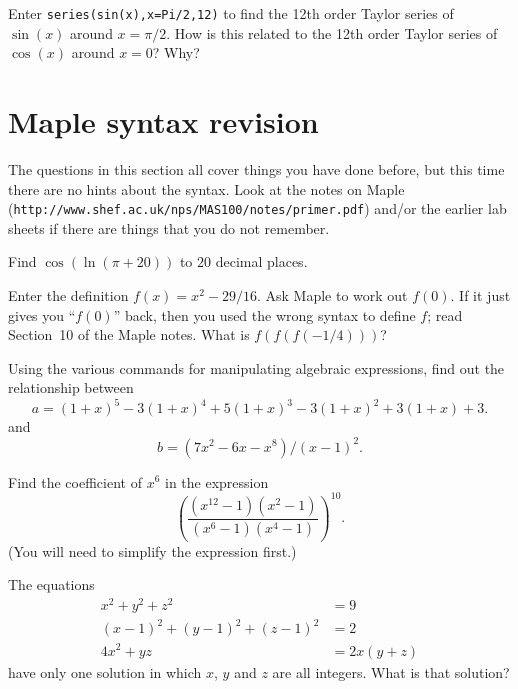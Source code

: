 \documentclass[a4paper,10pt]{amsbook}
\begin{document}
\begin{exercise}\label{ex-sin-shift}
 Enter \verb~series(sin(x),x=Pi/2,12)~ to find the 12th
 order Taylor series of $\sin(x)$ around $x=\pi/2$.  How
 is this related to the 12th order Taylor series of
 $\cos(x)$ around $x=0$?  Why? 
\end{exercise}

\section{Maple syntax revision}

The questions in this section all cover things you have done
before, but this time there are no hints about the syntax. 
Look at the notes on Maple
(\verb~http://www.shef.ac.uk/nps/MAS100/notes/primer.pdf~)
and/or the earlier lab sheets if there are things that you
do not remember. 

\begin{exercise}
 Find $\cos(\ln(\pi+20))$ to $20$ decimal places. 
\end{exercise}

\begin{exercise}
 Enter the definition $f(x)=x^2-29/16$.  Ask Maple to work
 out $f(0)$.  If it just gives you ``$f(0)$'' back, then you
 used the wrong syntax to define $f$; read Section~10 of the
 Maple notes.  What is $f(f(f(-1/4)))$? 
\end{exercise}

\begin{exercise}
 Using the various commands for manipulating
 algebraic expressions, find out the relationship between
 \[ a = (1+x)^5-3(1+x)^4+5(1+x)^3-3(1+x)^2+3(1+x)+3. \]
 and
 \[ b = (7x^2-6x-x^8)/(x-1)^2. \]
\end{exercise}

\begin{exercise}
 Find the coefficient of $x^6$ in the expression
 \[
  \left(\frac{(x^{12}-1)(x^2-1)}{(x^6-1)(x^4-1)}\right)^{10}. 
 \]
 (You will need to simplify the expression first.) 
\end{exercise}

\begin{exercise}
 The equations
 \begin{align*}
  x^2+y^2+z^2 &= 9 \\
  (x-1)^2 + (y-1)^2 + (z-1)^2 &= 2 \\
  4x^2+yz &= 2x(y+z) 
 \end{align*}
 have only one solution in which $x$, $y$ and $z$ are all
 integers.  What is that solution? 
\end{exercise}
\end{document}
